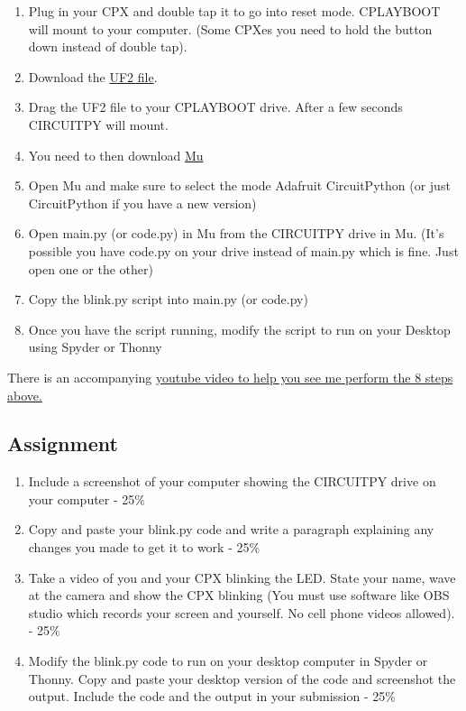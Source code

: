 \begin{enumerate}[itemsep=-5pt]
\item Plug in your CPX and double tap it to go into reset
  mode. CPLAYBOOT will mount to your computer. (Some CPXes you need to hold the button down instead of double tap).
\item Download the \href{https://circuitpython.org/downloads}{UF2
  file}.
\item Drag the UF2 file to your CPLAYBOOT drive. After a few seconds
  CIRCUITPY will mount.
\item You need to then download
  \href{https://codewith.mu/en/download}{Mu}
\item Open Mu and make sure to select the mode Adafruit CircuitPython (or just CircuitPython if you have a new version)
\item Open main.py (or code.py) in Mu from the CIRCUITPY drive in Mu. (It's possible you have code.py on your drive instead of main.py which is fine. Just open one or the other)
\item Copy the blink.py script into main.py (or code.py)
\item Once you have the script running, modify the script to run on
  your Desktop using Spyder or Thonny
\end{enumerate}

There is an accompanying
\href{https://www.youtube.com/watch?v=XFvLn6rwm3I}{youtube video to
  help you see me perform the 8 steps above.}

\subsection{Assignment}



\begin{enumerate}[itemsep=-5pt]
\item Include a screenshot of your computer showing the CIRCUITPY drive on your computer - 25\%
\item Copy and paste your blink.py code and write a paragraph explaining any changes you made to get it to work - 25\%
\item Take a video of you and your CPX blinking the LED. State your name, wave at the camera and show the CPX blinking (You must use software like OBS studio which records your screen and yourself. No cell phone videos allowed). - 25\%
\item Modify the blink.py code to run on your desktop computer in
  Spyder or Thonny. Copy and paste your desktop version of the code
  and screenshot the output. Include the code and the output in your
  submission - 25\%
\end{enumerate}
